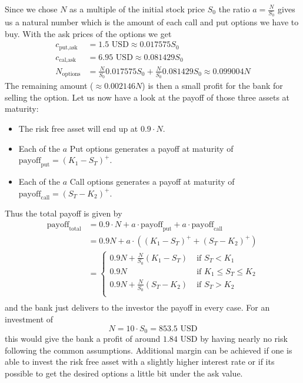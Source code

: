 \documentclass[11pt,oneside,a4paper]{article}
\begin{document}
	Since we chose $ N $ as a multiple of the initial stock price $ S_0 $ the ratio $ a = \frac{N}{S_0} $ gives us a natural number which is the amount of each call and put options we have to buy.
	With the ask prices of the options we get 
	\begin{align*}
	c_{\text{put,ask}} &= 1.5 \text{ USD} \approx 0.017575 S_0 \\
	c_{\text{cal,ask}} &= 6.95 \text{ USD} \approx 0.081429 S_0  \\
	N_{\text{options}} &= \frac{N}{S_0} 0.017575 S_0 + \frac{N}{S_0} 0.081429 S_0 \approx 0.099004 N
	\end{align*}
	The remaining amount ($ \approx 0.002146 N $) is then a small profit for the bank for selling the option. Let us now have a look at the payoff of those three assets at maturity:
	\begin{itemize}
		\item The risk free asset will end up at $ 0.9\cdot N $.
		\item Each of the $ a $ Put options generates a payoff at maturity of $ \text{payoff}_{\text{put}} = (K_1-S_T)^{+} $.
		\item Each of the $ a $ Call options generates a payoff at maturity of $ \text{payoff}_{\text{call}} = (S_T- K_2)^{+} $.
	\end{itemize}
	Thus the total payoff is given by
	\begin{align*}
		\text{payoff}_{\text{total}} &= 0.9\cdot	N + a \cdot \text{payoff}_{\text{put}} + a \cdot \text{payoff}_{\text{call}} \\ &= 0.9N + a\cdot((K_1-S_T)^+ + (S_T- K_2)^+) \\
		&=
		\begin{cases}
				0.9N + \frac{N}{S_0}(K_1 - S_T) \; &\text{if } S_T < K_1 \\
				0.9N  \; &\text{if } K_1 \leq S_T \leq K_2 \\
				0.9N + \frac{N}{S_0}(S_T-K_2) \; &\text{if }S_T > K_2 \\
		\end{cases} \\
	\end{align*}
	and the bank just delivers to the investor the payoff in every case. 
	For an investment of \[N = 10\cdot S_0 = 853.5 \text{ USD} \] this would give the bank a profit of around $ 1.84 \text{ USD} $ by having nearly no risk following the common assumptions. Additional margin can be achieved if one is able to invest the risk free asset with a slightly higher interest rate or if its possible to get the desired options a little bit under the ask value.
	\newpage
\end{document}
